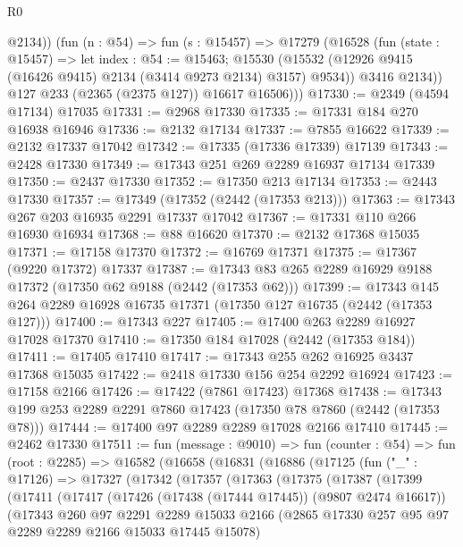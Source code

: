 \begin{lexlean}{R0}
\begin{coremodule}
              @2134))
          (fun (n : @54) =>
          fun (s : @15457) =>
          @17279
            (@16528
              (fun (state : @15457) =>
              let index : @54 := @15463;
              @15530 (@15532 (@12926 @9415 (@16426 @9415) @2134 (@3414 @9273 @2134) @3157) @9534))
              @3416
              @2134))
          @127
          @233
          (@2365 (@2375 @127))
          @16617
          @16506)))
@17330 := @2349 (@4594 @17134) @17035
@17331 := @2968 @17330
@17335 := @17331 @184 @270 @16938 @16946
@17336 := @2132 @17134
@17337 := @7855 @16622
@17339 := @2132 @17337 @17042
@17342 := @17335 (@17336 @17339) @17139
@17343 := @2428 @17330
@17349 := @17343 @251 @269 @2289 @16937 @17134 @17339
@17350 := @2437 @17330
@17352 := @17350 @213 @17134
@17353 := @2443 @17330
@17357 := @17349 (@17352 (@2442 (@17353 @213)))
@17363 := @17343 @267 @203 @16935 @2291 @17337 @17042
@17367 := @17331 @110 @266 @16930 @16934
@17368 := @88 @16620
@17370 := @2132 @17368 @15035
@17371 := @17158 @17370
@17372 := @16769 @17371
@17375 := @17367 (@9220 @17372) @17337
@17387 := @17343 @83 @265 @2289 @16929 @9188 @17372 (@17350 @62 @9188 (@2442 (@17353 @62)))
@17399 := @17343 @145 @264 @2289 @16928 @16735 @17371 (@17350 @127 @16735 (@2442 (@17353 @127)))
@17400 := @17343 @227
@17405 := @17400 @263 @2289 @16927 @17028 @17370
@17410 := @17350 @184 @17028 (@2442 (@17353 @184))
@17411 := @17405 @17410
@17417 := @17343 @255 @262 @16925 @3437 @17368 @15035
@17422 := @2418 @17330 @156 @254 @2292 @16924
@17423 := @17158 @2166
@17426 := @17422 (@7861 @17423) @17368
@17438 := @17343 @199 @253 @2289 @2291 @7860 @17423 (@17350 @78 @7860 (@2442 (@17353 @78)))
@17444 := @17400 @97 @2289 @2289 @17028 @2166 @17410
@17445 := @2462 @17330
@17511 := fun (message : @9010) =>
  fun (counter : @54) =>
  fun (root : @2285) =>
  @16582
    (@16658
      (@16831
        (@16886
          (@17125
            (fun ("_" : @17126) =>
            @17327
              (@17342
                (@17357
                  (@17363
                    (@17375
                      (@17387
                        (@17399
                          (@17411
                            (@17417
                              (@17426 (@17438 (@17444 @17445)) (@9807 @2474 @16617))
                              (@17343
                                @260
                                @97
                                @2291
                                @2289
                                @15033
                                @2166
                                (@2865 @17330 @257 @95 @97 @2289 @2289 @2166 @15033 @17445 @15078)

\end{coremodule}
\end{lexlean}

